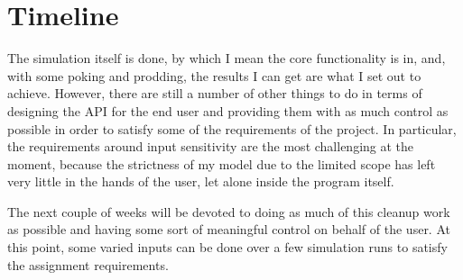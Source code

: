 \section{Timeline}\label{sec:Timeline}

The simulation itself is done, by which I mean the core functionality is in, and, with some poking and prodding, the results I can get are what I set out to achieve. However, there are still a number of other things to do in terms of designing the API for the end user and providing them with as much control as possible in order to satisfy some of the requirements of the project. In particular, the requirements around input sensitivity are the most challenging at the moment, because the strictness of my model due to the limited scope has left very little in the hands of the user, let alone inside the program itself.

The next couple of weeks will be devoted to doing as much of this cleanup work as possible and having some sort of meaningful control on behalf of the user. At this point, some varied inputs can be done over a few simulation runs to satisfy the assignment requirements.


